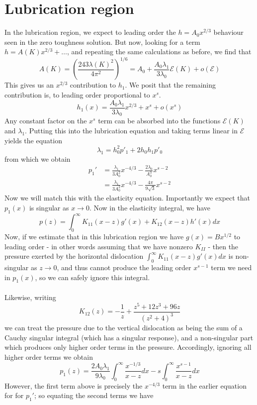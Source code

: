 \documentclass{article}
\newcommand{\cE}{\mathcal{E}}                               %
\begin{document}
%
\section{Lubrication region}
In the lubrication region, we expect to leading order the $h = A_0x^{2/3}$
behaviour seen in the zero toughness solution. But now, looking for a term
$h = A(K) x^{2/3} + \dots$, and repeating the same calculations as before, 
we find that
\[ A(K) = \left( \frac{243 \lambda(K)^2}{4\pi^2} \right)^{1/6} =
A_0 + \frac{A_0\lambda_1}{3\lambda_0}\cE(K)+o(\cE) \]
This gives us an $x^{2/3}$ contribution to $h_1$. We posit that the remaining
contribution is, to leading order proportional to $x^s$.
\[ h_1(x) = \frac{A_0 \lambda_1}{3\lambda_0} x^{2/3} + x^s + o(x^s) \]
Any constant factor on the $x^s$ term can be absorbed into the functions 
$\cE(K)$ and $\lambda_1$. Putting this into the lubrication equation and 
taking terms linear in $\cE$ yields the equation
\[ \lambda_1 = h_0^2p'_1 + 2h_0h_1p'_0 \]
from which we obtain
\begin{align*}
p_1' &= \frac{\lambda_1}{3A_0^2}x^{-4/3} - \frac{2\lambda_0}{A_0^3}x^{s-2} \\
 &= \frac{\lambda_1}{3A_0^2}x^{-4/3} - \frac{4\pi}{9\sqrt{3}}x^{s-2} 
\end{align*}
Now we will match this with the elasticity equation. Importantly we expect 
that $p_1(x)$ is singular as $x\to 0$. Now in the elasticity integral, we have
\[p(z) = \int_0^{\infty} K_{11}(x-z)g'(x) + K_{12}(x-z)h'(x) dx \]
Now, if we estimate that in this lubrication region we have $g(x)=Bx^{1/2}$
to leading order - in other words assuming that we have nonzero $K_{II}$ -
then the pressure exerted by the horizontal dislocation $\int_0^{\infty}
K_{11}(x-z)g'(x) dx$ is non-singular as $z\to0$, and thus cannot produce
the leading order $x^{s-1}$ term we need in $p_1(x)$, so we can safely ignore
this integral.
\\
\\
Likewise, writing
\[ K_{12}(z) = - \frac{1}{z} + \frac{z^5+12z^3 +96z}{(z^2+4)^3} \]
we can treat the pressure due to the vertical dislocation as being the sum of 
a Cauchy singular integral (which has a singular response), and a 
non-singular part which produces only higher order terms in the pressure.
Accordingly, ignoring all higher order terms we obtain
\[ p_1(z) = \frac{2A_0\lambda_1}{9\lambda_0} \int_0^{\infty} 
\frac{x^{-1/3}}{x-z} dx - s\int_0^{\infty} \frac{x^{s-1}}{x-z} dx \]
However, the first term above is precisely the $x^{-4/3}$ term in the earlier 
equation for for $p_1'$; so equating the second terms we have
\end{document}
